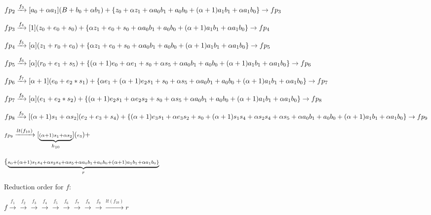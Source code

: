 \begin{Example}
\begin{small}
$fp_2\xrightarrow[]{f_3}[a_0+\alpha a_1](B+b_0+\alpha b_1)+\{z_0+\alpha z_1+\alpha a_0b_1+a_0b_0+ (\alpha+1)a_1b_1 + \alpha a_1b_0\}\rightarrow fp_3$

$fp_3\xrightarrow[]{f_4}[1](z_0+e_0+s_0)+\{\alpha z_1+e_0+s_0+\alpha a_0b_1+a_0b_0+(\alpha+1)a_1b_1+\alpha a_1b_0\}\rightarrow fp_4$

$fp_4\xrightarrow[]{f_5}[\alpha](z_1+r_0+e_0)+\{\alpha z_1+e_0+s_0+\alpha a_0b_1+a_0b_0+(\alpha+1)a_1b_1+\alpha a_1b_0\}\rightarrow fp_5$

$fp_5\xrightarrow[]{f_6}[\alpha](r_0+e_1+s_5)+\{(\alpha+1)e_0+\alpha e_1+s_0+\alpha s_5+\alpha a_0b_1+a_0b_0+(\alpha+1)a_1b_1+\alpha a_1b_0\}\rightarrow fp_6$

$fp_6\xrightarrow[]{f_7}[\alpha+1](e_0+e_2*s_1)+\{\alpha e_1+(\alpha+1)e_2s_1+s_0+\alpha s_5+\alpha a_0b_1+a_0b_0+(\alpha+1)a_1b_1+\alpha a_1b_0\}\rightarrow fp_7$

$fp_7\xrightarrow[]{f_8}[\alpha](e_1+e_2*s_2)+\{(\alpha+1)e_2s_1+\alpha e_2s_2 + s_0+\alpha s_5+\alpha a_0b_1+a_0b_0+(\alpha+1)a_1b_1+\alpha a_1b_0\}\rightarrow fp_8$

$fp_8\xrightarrow[]{f_9}[(\alpha+1)s_1 + \alpha s_2](e_2+e_3+s_4)+\{(\alpha+1)e_3s_1+ \alpha e_3s_2 +s_0+(\alpha+1)s_1s_4+\alpha s_2s_4+\alpha s_5+\alpha a_0b_1+a_0b_0+(\alpha+1)a_1b_1+\alpha a_1b_0\}\rightarrow fp_9$
\end{small}

\begin{small}

${\scriptstyle fp_9}\xrightarrow[]{{\scriptstyle lt(f_{10})}}[\underbrace{{\scriptstyle (\alpha+1)s_1+\alpha s_2}}_\text{$h_{10}$}]({\scriptstyle e_3})+$ 

$\{\underbrace{{\scriptstyle s_0+(\alpha+1)s_1s_4+\alpha s_2s_4+\alpha s_5+\alpha a_0b_1+a_0b_0+(\alpha+1)a_1b_1+\alpha a_1b_0\}}}_\text{$r$}$ 
\end{small}

Reduction order for $f:$

$f\xrightarrow[]{f_{1}}\xrightarrow[]{f_2}\xrightarrow[]{f_3}\xrightarrow[]{f_4}\xrightarrow[]{f_5}\xrightarrow[]{f_6}\xrightarrow[]{f_7}\xrightarrow[]{f_8}\xrightarrow[]{f_9}\xrightarrow[]{lt(f_{10})}r$


\end{Example}
